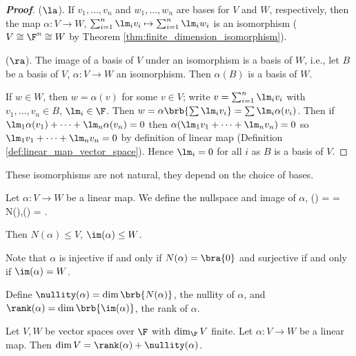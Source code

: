 \begin{proof}[\bf Proof]
($\la$). If $v_1, \dots, v_n$ and $w_1, \dots,w_n$ are bases for $V$ and $W$, respectively, then the map $\alpha : V \to W$, $\sum^n_{i=1} \lm_iv_i \mapsto \sum^n_{i=1} \lm_iw_i$ is an isomorphism ($V \cong \F^n \cong W$ by Theorem \ref{thm:finite_dimension_isomorphism}).

($\ra$). The image of a basis of $V$ under an isomorphism is a basis of $W$, i.e., let $B$ be a basis of $V$, $\alpha : V \to W$ an isomorphism. Then $\alpha(B)$ is a basis of $W$.

If $w \in W$, then $w = \alpha(v)$ for some $v \in V$; write $v = \sum^n_{i=1} \lm_iv_i$ with $v_1, \dots, v_n \in B$, $\lm_i \in \F$. Then $w = \alpha\brb{\sum \lm_iv_i} = \sum \lm_i\alpha(v_i)$. Then if $\lm_1\alpha(v_1)+\dots+\lm_n\alpha(v_n) = 0$ then $\alpha(\lm_1v_1+\dots+\lm_nv_n) = 0$ so $\lm_1v_1+\dots+\lm_nv_n = 0$ by definition of linear map (Definition \ref{def:linear_map_vector_space}). %
Hence $\lm_i = 0$ for all $i$ as $B$ is a basis of $V$.%
\end{proof}

\begin{remark}
These isomorphisms are not natural, they depend on the choice of bases.
\end{remark}

\begin{definition}\label{def:nullspace_nullity}
Let $\alpha : V \to W$ be a linear map. We define the nullspace and image of $\alpha$,
\be
\ker(\alpha) =  = N(\alpha),\qquad \im(\alpha) = .
\ee

Then $N(\alpha) \leq  V$, $\im(\alpha) \leq  W$.

Note that $\alpha$ is injective if and only if $N(\alpha) = \bra{0}$ and surjective if and only if $\im(\alpha) = W$.

Define $\nullity(\alpha) = \dim \brb{N(\alpha)}$, the nullity of $\alpha$, and $\rank(\alpha) = \dim \brb{\im(\alpha)}$, the rank of $\alpha$.
\end{definition}

\begin{theorem}\label{thm:rank_nullity}
Let $V , W$ be vector spaces over $\F$ with $\dim_\F V$ finite. Let $\alpha : V \to W$ be a linear map. Then $\dim V = \rank(\alpha) + \nullity(\alpha)$.
\end{theorem}

